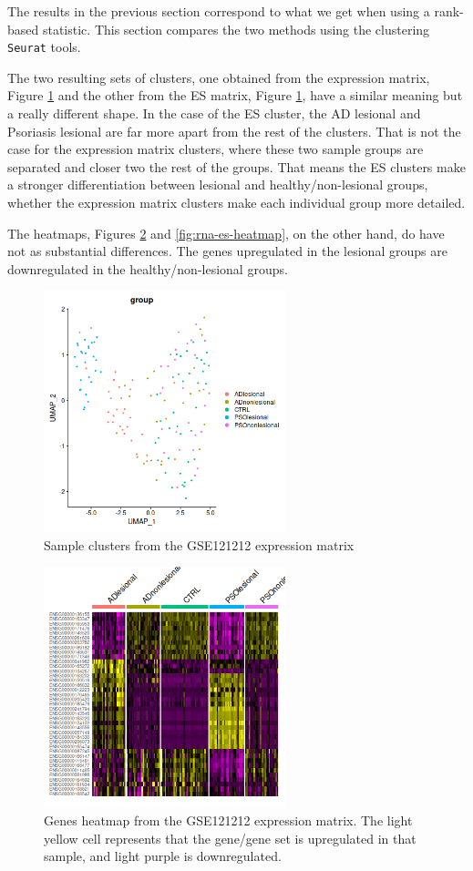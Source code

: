\documentclass[aps,prb,twocolumn,superscriptaddress,floatfix,longbibliography]{revtex4-2}
\newcounter{para}
\begin{document}
The results in the previous section correspond to what we get when using a rank-based statistic. This section compares the two methods using the clustering \texttt{Seurat} tools.

The two resulting sets of clusters, one obtained from the expression matrix, Figure \ref{fig:rna-expr-clusters} and the other from the ES matrix, Figure \ref{fig:rna-expr-clusters}, have a similar meaning but a really different shape. In the case of the ES cluster, the AD lesional and Psoriasis lesional are far more apart from the rest of the clusters. That is not the case for the expression matrix clusters, where these two sample groups are separated and closer two the rest of the groups. That means the ES clusters make a stronger differentiation between lesional and healthy/non-lesional groups, whether the expression matrix clusters make each individual group more detailed.

The heatmaps, Figures \ref{fig:rna-expr-heatmap} and \ref{fig:rna-es-heatmap}, on the other hand, do have not as substantial differences. The genes upregulated in the lesional groups are downregulated in the healthy/non-lesional groups.

\begin{figure}[h]
\centering
\includegraphics[clip=true,width=7cm]{img/GSE121212-expr-clusters.png}
\caption{Sample clusters from the GSE121212 expression matrix}
\label{fig:rna-expr-clusters}
\end{figure}

\begin{figure}[h!]
\centering
\includegraphics[clip=true,width=7cm]{img/GSE121212-expr-heatmap.png}
\caption{Genes heatmap from the GSE121212 expression matrix. The light yellow cell represents that the gene/gene set is upregulated in that sample, and light purple is downregulated.}
\label{fig:rna-expr-heatmap}
\end{figure}
\end{document}
